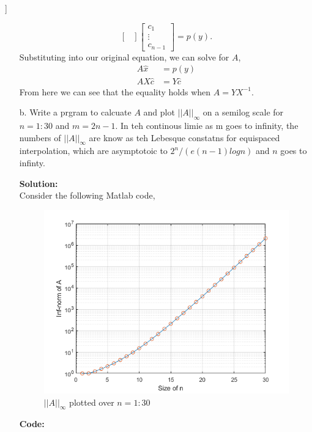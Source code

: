 \documentclass[12pt]{article}
\makeatletter
\theoremstyle{homework}
\newenvironment{exercise}[1]
{\def\@currentlabel{#1}\exercisecore}
{\endexercisecore}
\newcommand{\localhead}[1]{\par\smallskip\noindent\textbf{#1}\nobreak\\}%
\newcommand\solution{\localhead{Solution:}}
\makeatother
\begin{document}
\begin{exercise}[12.2]
\begin{enumerate}
\begin{equation*}
\begin{bmatrix}
        \end{bmatrix}
        \begin{bmatrix}
          c_1\\
          \vdots \\
          c_{n-1}
          \end{bmatrix}
           = p(y).
    \end{equation*}
    Substituting into our original equation, we can solve for $A$, 
    \begin{align*}
      A\hat{x} &= p(y)\\
      AX\hat{c} &= Y\hat{c}
    \end{align*}
    From here we can see that the equality holds when $A = YX^{-1}$.
    \vspace{.25in}



    \item[b.] Write a prgram to calcuate $A$ and plot $||A||_{\infty}$ on a semilog scale for $n = 1:30$ and $m = 2n-1$. 
    In teh continous limie as m goes to infinity, the numbers of $||A||_{\infty}$ are know as teh Lebesque constatns for equispaced 
    interpolation, which are asymptotoic to $2^n/(e(n-1)logn)$ and $n$ goes to infinty. \\
    \solution Consider the following Matlab code, \\
    \begin{figure}[H]
      \begin{center}
        \caption{$||A||_{\infty}$ plotted over $n = 1:30$}
         \includegraphics[width=.90\textwidth]{Fig3.png}
      \end{center}
    \end{figure}
    \textbf{Code:}
    \begin{center}
      
    \end{center}
    \vspace{.25in}



\end{enumerate}
\end{exercise}
\end{document}
